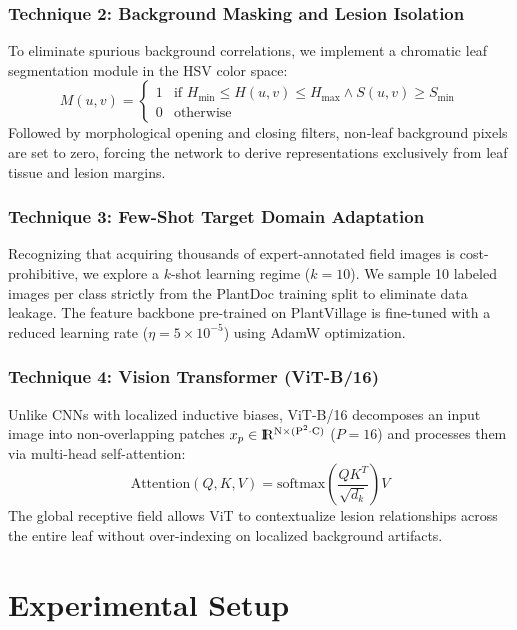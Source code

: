 \documentclass[twoside,a4paper,11pt]{article}
\newcommand{\Runo}{\rm I\hspace{-0.55ex}R}
\begin{document}
\subsubsection{Technique 2: Background Masking and Lesion Isolation}
To eliminate spurious background correlations, we implement a chromatic leaf segmentation module in the HSV color space:
\begin{equation}
M(u, v) = \begin{cases} 
1 & \text{if } H_{\text{min}} \le H(u, v) \le H_{\text{max}} \land S(u, v) \ge S_{\text{min}} \\
0 & \text{otherwise}
\end{cases}
\end{equation}
Followed by morphological opening and closing filters, non-leaf background pixels are set to zero, forcing the network to derive representations exclusively from leaf tissue and lesion margins.

\subsubsection{Technique 3: Few-Shot Target Domain Adaptation}
Recognizing that acquiring thousands of expert-annotated field images is cost-prohibitive, we explore a $k$-shot learning regime ($k=10$). We sample 10 labeled images per class strictly from the PlantDoc training split to eliminate data leakage. The feature backbone pre-trained on PlantVillage is fine-tuned with a reduced learning rate ($\eta = 5 \times 10^{-5}$) using AdamW optimization.

\subsubsection{Technique 4: Vision Transformer (ViT-B/16)}
Unlike CNNs with localized inductive biases, ViT-B/16 decomposes an input image into non-overlapping patches $x_p \in \Runo^{N \times (P^2 \cdot C)}$ ($P=16$) and processes them via multi-head self-attention:
\begin{equation}
\text{Attention}(Q, K, V) = \text{softmax}\left(\frac{QK^T}{\sqrt{d_k}}\right)V
\end{equation}
The global receptive field allows ViT to contextualize lesion relationships across the entire leaf without over-indexing on localized background artifacts.

\section{Experimental Setup}
\end{document}
